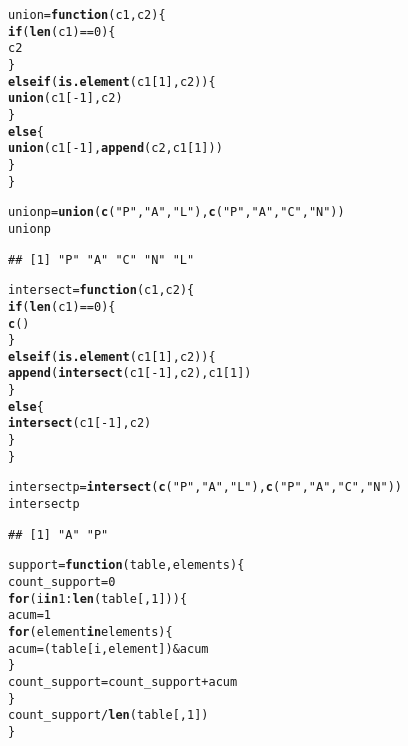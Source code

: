 \documentclass[12pt]{report}\usepackage[]{graphicx}\usepackage[dvipsnames]{xcolor}
\makeatletter
\newcommand{\hlnum}[1]{\textcolor[rgb]{0.686,0.059,0.569}{#1}}%
\newcommand{\hlstr}[1]{\textcolor[rgb]{0.192,0.494,0.8}{#1}}%
\newcommand{\hlopt}[1]{\textcolor[rgb]{0,0,0}{#1}}%
\newcommand{\hlstd}[1]{\textcolor[rgb]{0.345,0.345,0.345}{#1}}%
\newcommand{\hlkwa}[1]{\textcolor[rgb]{0.161,0.373,0.58}{\textbf{#1}}}%
\newcommand{\hlkwb}[1]{\textcolor[rgb]{0.69,0.353,0.396}{#1}}%
\newcommand{\hlkwc}[1]{\textcolor[rgb]{0.333,0.667,0.333}{#1}}%
\newcommand{\hlkwd}[1]{\textcolor[rgb]{0.737,0.353,0.396}{\textbf{#1}}}%
\newenvironment{kframe}{%
 \def\at@end@of@kframe{}%
 \ifinner\ifhmode%
  \def\at@end@of@kframe{\end{minipage}}%
  \begin{minipage}{\columnwidth}%
 \fi\fi%
 \def\FrameCommand##1{\hskip\@totalleftmargin \hskip-\fboxsep
 \colorbox{shadecolor}{##1}\hskip-\fboxsep
     \hskip-\linewidth \hskip-\@totalleftmargin \hskip\columnwidth}%
 \MakeFramed {\advance\hsize-\width
   \@totalleftmargin\z@ \linewidth\hsize
   \@setminipage}}%
 {\par\unskip\endMakeFramed%
 \at@end@of@kframe}
\newenvironment{knitrout}{}{} %
\makeatother
\begin{document}
\begin{knitrout}
\color{fgcolor}\begin{kframe}
\begin{alltt}
\hlstd{union} \hlkwb{=} \hlkwa{function}\hlstd{(}\hlkwc{c1}\hlstd{,} \hlkwc{c2}\hlstd{)\{}
        \hlkwa{if} \hlstd{(}\hlkwd{len}\hlstd{(c1)} \hlopt{==} \hlnum{0}\hlstd{)\{}
                \hlstd{c2}
        \hlstd{\}}
        \hlkwa{else if} \hlstd{(}\hlkwd{is.element}\hlstd{(c1[}\hlnum{1}\hlstd{], c2))\{}
                \hlkwd{union}\hlstd{(c1[}\hlopt{-}\hlnum{1}\hlstd{], c2)}
        \hlstd{\}}
        \hlkwa{else}\hlstd{\{}
                \hlkwd{union}\hlstd{(c1[}\hlopt{-}\hlnum{1}\hlstd{],} \hlkwd{append}\hlstd{(c2, c1[}\hlnum{1}\hlstd{]))}
        \hlstd{\}}
\hlstd{\}}

\hlstd{unionp} \hlkwb{=} \hlkwd{union}\hlstd{(}\hlkwd{c}\hlstd{(}\hlstr{"P"}\hlstd{,}\hlstr{"A"}\hlstd{,} \hlstr{"L"}\hlstd{),} \hlkwd{c}\hlstd{(}\hlstr{"P"}\hlstd{,}\hlstr{"A"}\hlstd{,} \hlstr{"C"}\hlstd{,} \hlstr{"N"}\hlstd{))}
\hlstd{unionp}
\end{alltt}
\begin{verbatim}
## [1] "P" "A" "C" "N" "L"
\end{verbatim}
\begin{alltt}
\hlstd{intersect} \hlkwb{=} \hlkwa{function}\hlstd{(}\hlkwc{c1}\hlstd{,} \hlkwc{c2}\hlstd{)\{}
        \hlkwa{if} \hlstd{(}\hlkwd{len}\hlstd{(c1)} \hlopt{==} \hlnum{0}\hlstd{)\{}
                \hlkwd{c}\hlstd{()}
        \hlstd{\}}
        \hlkwa{else if} \hlstd{(}\hlkwd{is.element}\hlstd{(c1[}\hlnum{1}\hlstd{], c2))\{}
                \hlkwd{append}\hlstd{(}\hlkwd{intersect}\hlstd{(c1[}\hlopt{-}\hlnum{1}\hlstd{], c2), c1[}\hlnum{1}\hlstd{])}
        \hlstd{\}}
        \hlkwa{else}\hlstd{\{}
                \hlkwd{intersect}\hlstd{(c1[}\hlopt{-}\hlnum{1}\hlstd{], c2)}
        \hlstd{\}}
\hlstd{\}}

\hlstd{intersectp} \hlkwb{=} \hlkwd{intersect}\hlstd{(}\hlkwd{c}\hlstd{(}\hlstr{"P"}\hlstd{,}\hlstr{"A"}\hlstd{,} \hlstr{"L"}\hlstd{),} \hlkwd{c}\hlstd{(}\hlstr{"P"}\hlstd{,}\hlstr{"A"}\hlstd{,} \hlstr{"C"}\hlstd{,} \hlstr{"N"}\hlstd{))}
\hlstd{intersectp}
\end{alltt}
\begin{verbatim}
## [1] "A" "P"
\end{verbatim}
\begin{alltt}
\hlstd{support} \hlkwb{=} \hlkwa{function}\hlstd{(}\hlkwc{table}\hlstd{,} \hlkwc{elements}\hlstd{)\{}
        \hlstd{count_support} \hlkwb{=} \hlnum{0}
        \hlkwa{for} \hlstd{(i} \hlkwa{in} \hlnum{1}\hlopt{:}\hlkwd{len}\hlstd{(table[,}\hlnum{1}\hlstd{]))\{}
                \hlstd{acum} \hlkwb{=} \hlnum{1}
                \hlkwa{for} \hlstd{(element} \hlkwa{in} \hlstd{elements)\{}
                        \hlstd{acum} \hlkwb{=} \hlstd{(table[i,element])} \hlopt{&} \hlstd{acum}
                \hlstd{\}}
                \hlstd{count_support} \hlkwb{=} \hlstd{count_support} \hlopt{+} \hlstd{acum}
        \hlstd{\}}
        \hlstd{count_support}\hlopt{/}\hlkwd{len}\hlstd{(table[,}\hlnum{1}\hlstd{])}
\hlstd{\}}


\end{alltt}
\end{kframe}
\end{knitrout}
\end{document}
